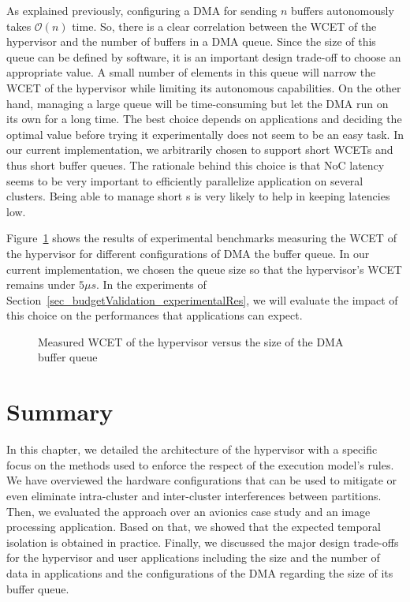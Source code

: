 \documentclass[main.tex]{subfiles}
\begin{document}
As explained previously, configuring a DMA for sending $n$ buffers autonomously takes $\mathcal{O}(n)$ time. So, there is a clear correlation between the WCET of the hypervisor and the number of buffers in a DMA queue. Since the size of this queue can be defined by software, it is an important design trade-off to choose an appropriate value. A small number of elements in this queue will narrow the WCET of the hypervisor while limiting its autonomous capabilities. On the other hand, managing a large queue will be time-consuming but let the DMA run on its own for a long time. The best choice depends on applications and deciding the optimal value before trying it experimentally does not seem to be an easy task. In our current implementation, we arbitrarily chosen to support short WCETs and thus short buffer queues. The rationale behind this choice is that NoC latency seems to be very important to efficiently parallelize application on several clusters. Being able to manage short \PC{}s is very likely to help in keeping latencies low. 

Figure~\ref{fig_implemExecModel_WCETvsNbBufs} shows the results of experimental benchmarks measuring the WCET of the hypervisor for different configurations of DMA the buffer queue. In our current implementation, we chosen the queue size so that the hypervisor's WCET remains under $5 \mu s$. In the experiments of Section~\ref{sec_budgetValidation_experimentalRes}, we will evaluate the impact of this choice on the performances that applications can expect.

\begin{figure}
    \centering
    \scalebox{1}{}
    \caption{Measured WCET of the hypervisor versus the size of the DMA buffer queue}
    \label{fig_implemExecModel_WCETvsNbBufs}
\end{figure}

\section{Summary}
In this chapter, we detailed the architecture of the hypervisor with a specific focus on the methods used to enforce the respect of the execution model's rules. We have overviewed the hardware configurations that can be used to mitigate or even eliminate intra-cluster and inter-cluster interferences between partitions. Then, we evaluated the approach over an avionics case study and an image processing application. Based on that, we showed that the expected temporal isolation is obtained in practice. Finally, we discussed the major design trade-offs for the hypervisor and user applications including the size and the number of data in applications and the configurations of the DMA regarding the size of its buffer queue. 
\end{document}
